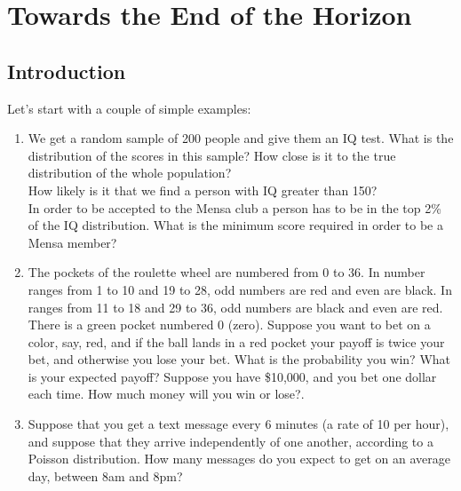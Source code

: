 \hypertarget{ch:llnclt}{%
\chapter{Towards the End of the Horizon}\label{ch:llnclt}}

\section{Introduction}
Let's start with a couple of simple examples:
\begin{enumerate}
\item We get a random sample of 200 people and give them an IQ test. What is the distribution of the scores in this sample? How close is it to the true distribution of the whole population?\\
How likely is it that we find a person with IQ greater than 150?\\
In order to be accepted to the Mensa club a person has to be in the top 2\% of the IQ distribution. What is the minimum score required in order to be a Mensa member?
\item The pockets of the roulette wheel are numbered from 0 to 36. In number ranges from 1 to 10 and 19 to 28, odd numbers are red and even are black. In ranges from 11 to 18 and 29 to 36, odd numbers are black and even are red. There is a green pocket numbered 0 (zero). Suppose you want to bet on a color, say, red, and if the ball lands in a red pocket your payoff is twice your bet, and otherwise you lose your bet. What is the probability you win? What is your expected payoff? Suppose you have \$10,000, and you bet one dollar each time. How much money will you win or lose?.
\item Suppose that you get a text message every 6 minutes (a rate of 10 per hour), and suppose that they arrive independently of one another, according to a Poisson distribution. How many messages do you expect to get on an average day, between 8am and 8pm? 
\end{enumerate}

